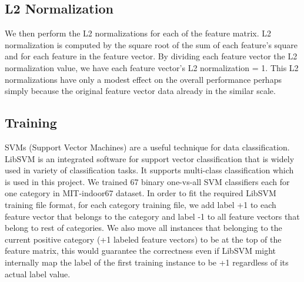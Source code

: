 \subsection{L2 Normalization}
We then perform the L2 normalizations for each of the feature matrix.
L2 normalization is computed by the square root of the sum of each feature's
square and for each feature in the feature vector. By dividing each feature
vector the L2 normalization value, we have each feature vector's
L2 normalization = 1. This L2 normalizations have only a modest effect on the
overall performance perhaps simply because the original feature vector data
already in the similar scale.

\subsection{Training}
SVMs (Support Vector Machines) are a useful technique for data classification.
LibSVM\cite{Chang:2011:CC01a} is an integrated software for support vector
classification that is widely used in variety of classification tasks.
It supports multi-class classification which is used in this project.
We trained 67 binary one-vs-all SVM classifiers each for one category in
MIT-indoor67 dataset.
In order to fit the required LibSVM training file format, for each category
training file, we add label +1 to each feature vector that belongs to the
category and label -1 to all feature vectors that belong to rest of categories.
We also move all instances that belonging to the current positive category
(+1 labeled feature vectors) to be at the top of the feature matrix, this would
guarantee the correctness even if LibSVM might internally map the label of the
first training instance to be +1 regardless of its actual label value.
